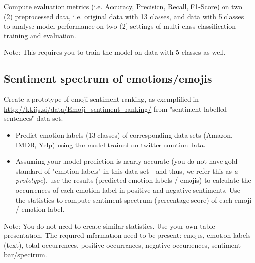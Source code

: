 \documentclass[a4paper,twoside,10pt]{article}
\begin{document}
Compute evaluation metrics (i.e. Accuracy, Precision, Recall, F1-Score) on two (2) preprocessed data, i.e. original data with 13 classes, and data with 5 classes to analyse model performance on two (2) settings of multi-class classification training and evaluation.

\justify
Note: This requires you to train the model on data with 5 classes as well. 

\subsection*{Sentiment spectrum of emotions/emojis}

\justify
Create a prototype of emoji sentiment ranking, as exemplified in \url{http://kt.ijs.si/data/Emoji_sentiment_ranking/} from "sentiment labelled sentences" data set.

\begin{itemize}
    \item Predict emotion labels (13 classes) of corresponding data sets (Amazon, IMDB, Yelp) using the model trained on twitter emotion data.
    \item Assuming your model prediction is nearly accurate (you do not have gold standard of "emotion labels" in this data set - and thus, we refer this as \textit{a prototype}), use the results (predicted emotion labels / emojis) to calculate the occurrences of each emotion label in positive and negative sentiments. Use the statistics to compute sentiment spectrum (percentage score) of each emoji / emotion label.    
\end{itemize}

\justify
Note: You do not need to create similar statistics. Use your own table presentation. The required information need to be present: emojis, emotion labels (text), total occurrences, positive occurrences, negative occurrences, sentiment bar/spectrum. 
\end{document}
